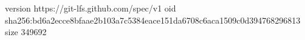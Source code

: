 version https://git-lfs.github.com/spec/v1
oid sha256:bd6a2ecce8bfaae2b103a7c5384eace151da6708c6aca1509c0d394768296813
size 349692

